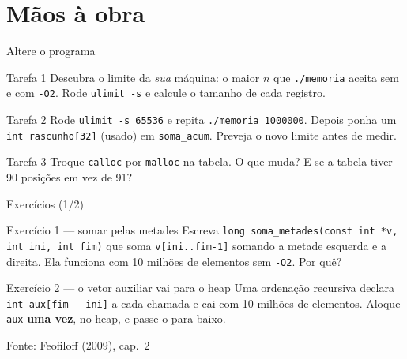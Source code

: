 \documentclass[aspectratio=169]{beamer}
\newcommand{\fonte}[1]{\vfill\hfill{\scriptsize\textcolor{UFSGray}{Fonte: #1}}}
\begin{document}
\section{Mãos à obra}

\begin{frame}{Altere o programa}
  \small
  \begin{block}{Tarefa 1}
    Descubra o limite da \emph{sua} máquina: o maior $n$ que
    \texttt{./memoria} aceita sem e com \texttt{-O2}. Rode
    \texttt{ulimit -s} e calcule o tamanho de cada registro.
  \end{block}
  \begin{block}{Tarefa 2}
    Rode \texttt{ulimit -s 65536} e repita \texttt{./memoria 1000000}.
    Depois ponha um \texttt{int rascunho[32]} (usado) em
    \texttt{soma\_acum}. Preveja o novo limite antes de medir.
  \end{block}
  \begin{block}{Tarefa 3}
    Troque \texttt{calloc} por \texttt{malloc} na tabela. O que muda? E se
    a tabela tiver 90 posições em vez de 91?
  \end{block}
\end{frame}

\begin{frame}{Exercícios (1/2)}
  \footnotesize
  \begin{block}{Exercício 1 --- somar pelas metades}
    Escreva \texttt{long soma\_metades(const int *v, int ini, int fim)}
    que soma \texttt{v[ini..fim-1]} somando a metade esquerda e a direita.
    Ela funciona com 10 milhões de elementos sem \texttt{-O2}. Por quê?
  \end{block}
  \begin{block}{Exercício 2 --- o vetor auxiliar vai para o heap}
    Uma ordenação recursiva declara \texttt{int aux[fim - ini]} a cada
    chamada e cai com 10 milhões de elementos. Aloque \texttt{aux}
    \textbf{uma vez}, no heap, e passe-o para baixo.
  \end{block}
  \fonte{Feofiloff (2009), cap.~2~\cite{feofiloff2009algoritmos}}
\end{frame}
\end{document}

